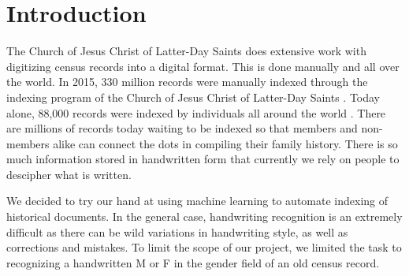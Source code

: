\section{Introduction}



The Church of Jesus Christ of Latter-Day Saints does extensive work with digitizing census records into a digital format.  This is done manually and all over the world.
In 2015, 330 million records were manually indexed through the indexing program of the Church of Jesus Christ of Latter-Day Saints \cite{web:indexingStats}.
Today alone, 88,000 records were indexed by individuals all around the world \cite{web:indexingStats}.
There are millions of records today waiting to be indexed so that members and non-members alike can connect the dots in compiling their family history.
There is so much information stored in handwritten form that currently we rely on people to descipher what is written.

We decided to try our hand at using machine learning to automate indexing of historical documents.  In the general case, handwriting recognition is an extremely difficult as there can be wild variations in handwriting style, as well as corrections and mistakes.  To limit the scope of our project, we limited the task to recognizing a handwritten M or F in the gender field of an old census record.

